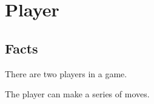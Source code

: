 \section{Player}

\subsection{Facts}

\begin{dashed}
    \item There are two players in a game.
    \item The player can make a series of moves.
\end{dashed}

